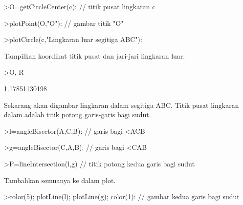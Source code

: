 \documentclass[12pt,arial,letterpaper]{book}
\begin{document}
\begin{eulernootebook}
\begin{eulercomment}
\begin{eulercomment}
\begin{eulernootebook}
\begin{eulercomment}
\begin{eulercomment}
\begin{eulercomment}
\begin{eulercomment}
\begin{eulercomment}
\begin{eulercomment}
\begin{eulernotebook}
\begin{eulercomment}
\begin{eulercomment}
\begin{eulerprompt}
>O=getCircleCenter(c): // titik pusat lingkaran c 
\end{eulerprompt}
\begin{eulerprompt}
>plotPoint(O,"O"): // gambar titik "O"
\end{eulerprompt}
\begin{eulerprompt}
>plotCircle(c,"Lingkaran luar segitiga ABC"):
\end{eulerprompt}
\begin{eulercomment}
Tampilkan koordinat titik pusat dan jari-jari lingkaran luar.
\end{eulercomment}
\begin{eulerprompt}
>O, R
\end{eulerprompt}
\begin{euleroutput}
  [1.16667,  1.16667]
  1.17851130198
\end{euleroutput}
\begin{eulercomment}
Sekarang akan digambar lingkaran dalam segitiga ABC. Titik pusat lingkaran dalam adalah
titik potong garis-garis bagi sudut.
\end{eulercomment}
\begin{eulerprompt}
>l=angleBisector(A,C,B): // garis bagi <ACB
\end{eulerprompt}
\begin{eulerprompt}
>g=angleBisector(C,A,B): // garis bagi <CAB
\end{eulerprompt}
\begin{eulerprompt}
>P=lineIntersection(l,g) // titik potong kedua garis bagi sudut
\end{eulerprompt}
\begin{euleroutput}
  [0.86038,  0.86038]
\end{euleroutput}
\begin{eulercomment}
Tambahkan semuanya ke dalam plot.
\end{eulercomment}
\begin{eulerprompt}
>color(5); plotLine(l); plotLine(g); color(1): // gambar kedua garis bagi sudut
\end{eulerprompt}

\end{eulercomment}
\end{eulercomment}
\end{eulernotebook}
\end{eulercomment}
\end{eulercomment}
\end{eulercomment}
\end{eulercomment}
\end{eulercomment}
\end{eulercomment}
\end{eulernootebook}
\end{eulercomment}
\end{eulercomment}
\end{eulernootebook}
\end{document}
